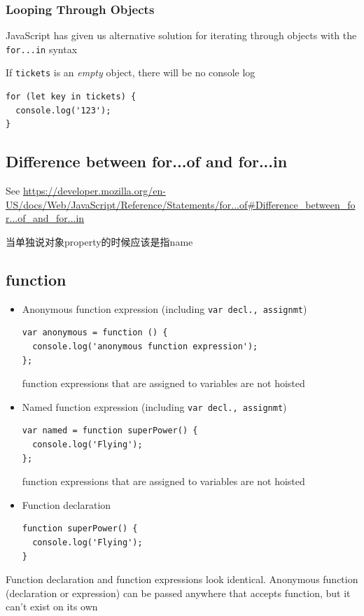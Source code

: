 \documentclass[a4paper, 12pt]{article}
\begin{document}
\subsubsection{Looping Through Objects}
JavaScript has given us alternative solution for iterating through objects with the \verb|for...in| syntax

If \verb|tickets| is an \textit{empty} object, there will be no console log
\begin{verbatim}
for (let key in tickets) {
  console.log('123');
}
\end{verbatim}

\subsection{Difference between for...of and for...in}
See \url{https://developer.mozilla.org/en-US/docs/Web/JavaScript/Reference/Statements/for...of#Difference_between_for...of_and_for...in}

当单独说对象property的时候应该是指name

\subsection{function}
\begin{itemize}
\item Anonymous function expression (including \verb|var decl., assignmt|)
\begin{verbatim}
var anonymous = function () {
  console.log('anonymous function expression');
};
\end{verbatim}
function expressions that are assigned to variables are not hoisted

\item Named function expression (including \verb|var decl., assignmt|)
\begin{verbatim}
var named = function superPower() {
  console.log('Flying');
};
\end{verbatim}
function expressions that are assigned to variables are not hoisted

\item Function declaration
\begin{verbatim}
function superPower() {
  console.log('Flying');
}
\end{verbatim}

\end{itemize}
Function declaration and function expressions look identical. Anonymous function (declaration or expression) can be passed anywhere that accepts function, but it can't exist on its own
\end{document}
